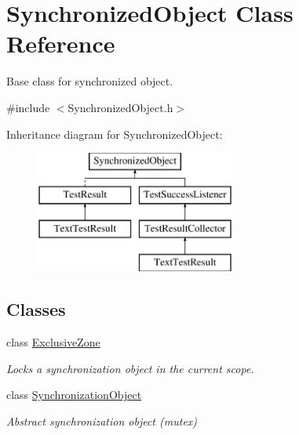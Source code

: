 \hypertarget{class_synchronized_object}{}\section{Synchronized\+Object Class Reference}
\label{class_synchronized_object}


Base class for synchronized object.  




{\ttfamily \#include $<$Synchronized\+Object.\+h$>$}

Inheritance diagram for Synchronized\+Object\+:\begin{figure}[H]
\begin{center}
\leavevmode
\includegraphics[height=4.000000cm]{class_synchronized_object}
\end{center}
\end{figure}
\subsection*{Classes}
\begin{DoxyCompactItemize}
\item 
class \hyperlink{class_synchronized_object_1_1_exclusive_zone}{Exclusive\+Zone}
\begin{DoxyCompactList}\small\item\em Locks a synchronization object in the current scope. \end{DoxyCompactList}\item 
class \hyperlink{class_synchronized_object_1_1_synchronization_object}{Synchronization\+Object}
\begin{DoxyCompactList}\small\item\em Abstract synchronization object (mutex) \end{DoxyCompactList}\end{DoxyCompactItemize}

